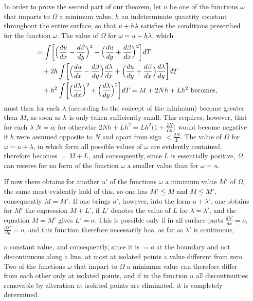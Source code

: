 \documentclass{article}
\begin{document}
In order to prove the second part of our theorem, let $u$ be one of the functions $\omega$ that imparts to $\varOmega$ a minimum value, $h$ an indeterminate quantity constant throughout the entire surface, so that $u + h\lambda$ satisfies the conditions prescribed for the function $\omega$. The value of $\varOmega$ for $\omega = u + h\lambda$, which
\[
\begin{aligned}
&= \int \biggl[\Bigl(\frac{du}{dx} - \frac{d\beta}{dy}\Bigr)^2 + \Bigl(\frac{du}{dy} + \frac{d\beta}{dx}\Bigr)^2\biggr] dT \\
&\quad + 2h \int \biggl[\Bigl(\frac{du}{dx} - \frac{d\beta}{dy}\Bigr)\frac{d\lambda}{dx} + \Bigl(\frac{du}{dy} + \frac{d\beta}{dx}\Bigr)\frac{d\lambda}{dy}\biggr] dT \\
&\quad + h^2 \int \biggl[\Bigl(\frac{d\lambda}{dx}\Bigr)^2 + \Bigl(\frac{d\lambda}{dy}\Bigr)^2\biggr] dT = M + 2Nh + Lh^2 \text{ becomes},
\end{aligned}
\]
must then for each $\lambda$ (according to the concept of the minimum) become greater than $M$, as soon as $h$ is only taken sufficiently small. This requires, however, that for each $\lambda$ $N = o$; for otherwise $2Nh + Lh^2 = Lh^2\bigl(1 + \frac{2N}{Lh}\bigr)$ would become negative if $h$ were assumed opposite to $N$ and apart from sign $< \frac{2N}{L}$. The value of $\varOmega$ for $\omega = u + \lambda$, in which form all possible values of $\omega$ are evidently contained, therefore becomes $= M + L$, and consequently, since $L$ is essentially positive, $\varOmega$ can receive for no form of the function $\omega$ a smaller value than for $\omega = u$.

If now there obtains for another $u'$ of the functions $\omega$ a minimum value $M'$ of $\varOmega$, the same must evidently hold of this, so one has $M' \leqq M$ and $M \leqq M'$, consequently $M = M'$. If one brings $u'$, however, into the form $u + \lambda'$, one obtains for $M'$ the expression $M + L'$, if $L'$ denotes the value of $L$ for $\lambda = \lambda'$, and the equation $M = M'$ gives $L' = o$. This is possible only if in all surface parts $\frac{d\lambda'}{dx} = o$, $\frac{d\lambda'}{dy} = o$, and this function therefore necessarily has, as far as $\lambda'$ is continuous,

a constant value, and consequently, since it is $= o$ at the boundary and not discontinuous along a line, at most at isolated points a value different from zero. Two of the functions $\omega$ that impart to $\varOmega$ a minimum value can therefore differ from each other only at isolated points, and if in the function $u$ all discontinuities removable by alteration at isolated points are eliminated, it is completely determined.
\end{document}
